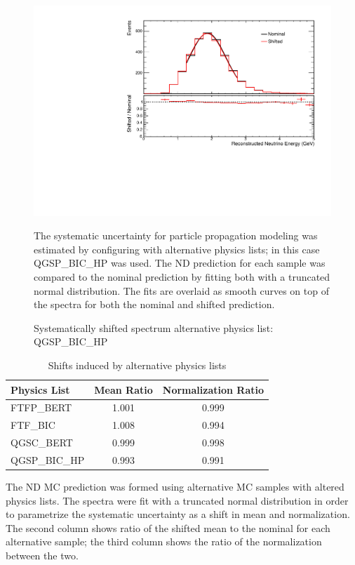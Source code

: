{\begin{figure}
\begin{center}
\includegraphics[width=\textwidth]{figures/systs/params/nd_QGSP_BIC_HP.pdf}
\end{center}
\caption{Systematically shifted spectrum alternative \geant
physics list: QGSP\_BIC\_HP}{
The systematic uncertainty for particle propagation modeling was estimated
by configuring \geant with alternative physics lists; in this case QGSP\_BIC\_HP
was used.
The ND prediction for each sample was compared to the nominal prediction
by fitting both with a truncated normal distribution.
The fits are overlaid as smooth curves on top of the spectra for both
the nominal and shifted prediction.
}
\label{syst_param_nd_QGSP_BIC_HP}

\end{figure}



\begin{table}
\begin{center}
\begin{tabular}{|l|c|c|}
\hline
\textbf{Physics List} & \textbf{Mean Ratio} & \textbf{Normalization Ratio} \\ \hline
FTFP\_BERT & 1.001 &  0.999\\ \hline
FTF\_BIC & 1.008 &  0.994 \\ \hline
QGSC\_BERT & 0.999 &  0.998\\ \hline
QGSP\_BIC\_HP & 0.993 &  0.991\\ \hline
\end{tabular}
\end{center}
\caption{Shifts induced by alternative \geant physics lists}{
The ND MC prediction was formed using alternative MC samples with altered
\geant physics lists.
The spectra were fit with a truncated normal distribution in order to
parametrize the systematic uncertainty as a shift in mean and normalization.
The second column shows ratio of the shifted mean to the nominal for each
alternative sample; the third column shows the ratio of the normalization
between the two.
}
\label{geant_shift_table}
\end{table}


}
